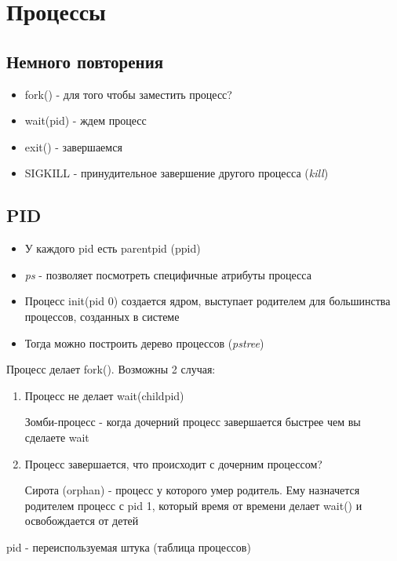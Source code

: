 \documentclass[../lectures.tex]{subfiles}
\begin{document}
\chapter{Процессы}


\section{Немного повторения}

\begin{itemize}
    \item fork() - для того чтобы заместить процесс?
    \item wait(pid) - ждем процесс
    \item exit() - завершаемся
    \item SIGKILL - принудительное завершение другого процесса (\emph{kill})
\end{itemize}

\section{PID}

\begin{itemize}
    \item У каждого pid есть parentpid (ppid)

    \item \emph{ps} - позволяет посмотреть специфичные атрибуты процесса

    \item Процесс init(pid 0) создается ядром, выступает родителем для большинства процессов, созданных в системе

    \item Тогда можно построить дерево процессов (\emph{pstree})
\end{itemize}

Процесс делает fork(). Возможны 2 случая:
\begin{enumerate}
    \item 
        Процесс не делает wait(childpid)

        Зомби-процесс - когда дочерний процесс завершается быстрее чем вы сделаете wait
    \item 
        Процесс завершается, что происходит с дочерним процессом?

        Сирота (orphan) - процесс у которого умер родитель. Ему назначется родителем процесс с pid 1, который время от времени делает wait() и освобождается от детей
\end{enumerate}
pid - переиспользуемая штука (таблица процессов)
\end{document}
